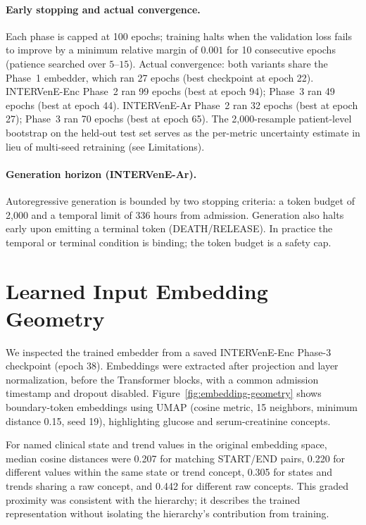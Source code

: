 \paragraph{Early stopping and actual convergence.}
Each phase is capped at 100 epochs; training halts when the validation loss fails to improve by a minimum relative margin of $0.001$ for 10 consecutive epochs (patience searched over $5$--$15$). Actual convergence: both variants share the Phase~1 embedder, which ran 27 epochs (best checkpoint at epoch 22). INTERVenE-Enc Phase~2 ran 99 epochs (best at epoch 94); Phase~3 ran 49 epochs (best at epoch 44). INTERVenE-Ar Phase~2 ran 32 epochs (best at epoch 27); Phase~3 ran 70 epochs (best at epoch 65). The 2{,}000-resample patient-level bootstrap on the held-out test set serves as the per-metric uncertainty estimate in lieu of multi-seed retraining (see Limitations).

\paragraph{Generation horizon (INTERVenE-Ar).}
Autoregressive generation is bounded by two stopping criteria: a token budget of 2{,}000 and a temporal limit of 336 hours from admission. Generation also halts early upon emitting a terminal token (DEATH/RELEASE). In practice the temporal or terminal condition is binding; the token budget is a safety cap.

\section{Learned Input Embedding Geometry}
\label{app:embedding-geometry}

We inspected the trained embedder from a saved INTERVenE-Enc Phase-3 checkpoint (epoch 38). Embeddings were extracted after projection and layer normalization, before the Transformer blocks, with a common admission timestamp and dropout disabled. Figure~\ref{fig:embedding-geometry} shows boundary-token embeddings using UMAP (cosine metric, 15 neighbors, minimum distance 0.15, seed 19), highlighting glucose and serum-creatinine concepts.

For named clinical state and trend values in the original embedding space, median cosine distances were 0.207 for matching START/END pairs, 0.220 for different values within the same state or trend concept, 0.305 for states and trends sharing a raw concept, and 0.442 for different raw concepts. This graded proximity was consistent with the hierarchy; it describes the trained representation without isolating the hierarchy's contribution from training.


